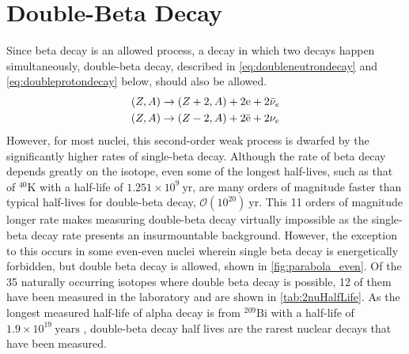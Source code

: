 \section{Double-Beta Decay}
\label{sec:Double Beta Decay}
Since beta decay is an allowed process, a decay in which two decays happen simultaneously, double-beta decay, described in \autoref{eq:doubleneutrondecay} and \autoref{eq:doubleprotondecay} below, should also be allowed.
\begin{align}
    (Z, A) & \rightarrow (Z+2, A)+2\textrm{e}+2\Bar{\nu}_e \label{eq:doubleneutrondecay} \\
    (Z, A) & \rightarrow (Z-2, A)+2\Bar{\textrm{e}}+2\nu_e \label{eq:doubleprotondecay} 
\end{align}
However, for most nuclei, this second-order weak process is dwarfed by the significantly higher rates of single-beta decay.
Although the rate of beta decay depends greatly on the isotope, even some of the longest half-lives, such as that of $^{40}$K with a half-life of $1.251\times10^{9}~\textrm{yr}$, are many orders of magnitude faster than typical half-lives for double-beta decay, $\mathcal{O}(10^{20})~\textrm{yr}$.
This 11 orders of magnitude longer rate makes measuring double-beta decay virtually impossible as the single-beta decay rate presents an insurmountable background.
However, the exception to this occurs in some even-even nuclei wherein single beta decay is energetically forbidden, but double beta decay is allowed, shown in \autoref{fig:parabola_even}.
Of the 35 naturally occurring isotopes where double beta decay is possible, 12 of them have been measured in the laboratory and are shown in \autoref{tab:2nuHalfLife}.
As the longest measured half-life of alpha decay is from $^{209}\textrm{Bi}$ with a half-life of $1.9 \times 10^{19}~\textrm{years}$ \cite{Marcillac:2003Bi-209detection}, double-beta decay half lives are the rarest nuclear decays that have been measured.
